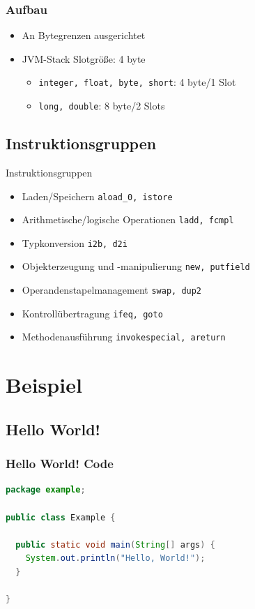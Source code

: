 \documentclass[10pt]{beamer}
\begin{document}

\begin{frame}[fragile]
\frametitle{Aufbau}
\begin{itemize}
\item An Bytegrenzen ausgerichtet
\item JVM-Stack Slotgröße: 4 byte
\begin{itemize}
\item {\tt integer, float, byte, short}: 4 byte/1 Slot
\item {\tt long, double}: 8 byte/2 Slots
\end{itemize}
\end{itemize}
\end{frame}


\subsection{Instruktionsgruppen}
\begin{frame}{Instruktionsgruppen}
\begin{itemize}
\item Laden/Speichern \hfill {\tt aload\_0, istore}\;\;\;\pause
\item Arithmetische/logische Operationen \hfill {\tt ladd, fcmpl}\;\;\;\pause
\item Typkonversion \hfill {\tt i2b, d2i}\;\;\;\pause
\item Objekterzeugung und -manipulierung \hfill {\tt new, putfield}\;\;\;\pause
\item Operandenstapelmanagement \hfill {\tt swap, dup2}\;\;\;\pause
\item Kontrollübertragung \hfill {\tt ifeq, goto}\;\;\;\pause
\item Methodenausführung \hfill {\tt invokespecial, areturn}\;\;\;
\end{itemize}
\end{frame}


\section{Beispiel}
\subsection{Hello World!}
\begin{frame}[fragile]
\frametitle{Hello World! Code}
\begin{lstlisting}[language=Java]
package example;

public class Example {

  public static void main(String[] args) {
    System.out.println("Hello, World!");
  }

}
\end{lstlisting}
\end{frame}
\end{document}
